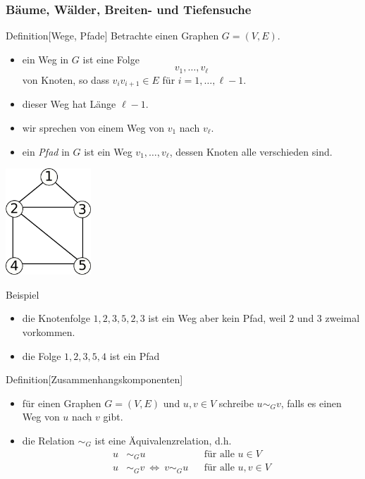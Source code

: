 \documentclass[aspectratio=1610, 11pt]{beamer}
\newcommand{\mytitle}{B\"aume, W\"alder, Breiten- und Tiefensuche}
\begin{document}
\begin{frame}\frametitle{\mytitle}
	\begin{overprint}
		\begin{block}{Definition\hfill[Wege, Pfade]}
		Betrachte einen Graphen $G=(V,E)$.
		\begin{itemize}
			\item ein \alert{Weg} in $G$ ist eine Folge
				$$v_1,\ldots,v_\ell$$
				von Knoten, so dass $v_iv_{i+1}\in E$ f\"ur $i=1,\ldots,\ell-1$.
			\item dieser Weg hat \alert{L\"ange} $\ell-1$.
			\item wir sprechen von einem \alert{Weg von $v_1$ nach $v_\ell$}.
			\item ein \emph{Pfad} in $G$ ist ein Weg $v_1,\ldots,v_\ell$, dessen Knoten alle verschieden sind.
		\end{itemize}
	\end{block}
		\hfill\includegraphics[height=40mm]{images/house.pdf}
\begin{exampleblock}{Beispiel}
	\begin{itemize}
		\item die Knotenfolge $1,2,3,5,2,3$ ist ein Weg aber kein Pfad, weil 2 und 3 zweimal vorkommen.
		\item die Folge $1,2,3,5,4$ ist ein Pfad
	\end{itemize}
	\end{exampleblock}
		\begin{block}{Definition\hfill[Zusammenhangskomponenten]}
	\begin{itemize}
		\item f\"ur einen Graphen $G=(V,E)$ und $u,v\in V$ schreibe $u\sim_G v$, falls es einen Weg von $u$ nach $v$ gibt.
		\item die Relation $\sim_G$ ist eine \"Aquivalenzrelation, d.h.
			\begin{align*}
				u&\sim_G u&&\mbox{f\"ur alle }u\in V\\
				u&\sim_G v\ \Leftrightarrow\ v\sim_Gu&&\mbox{f\"ur alle }u,v\in V\\

\end{align*}
\end{itemize}
\end{block}
\end{overprint}
\end{frame}
\end{document}
